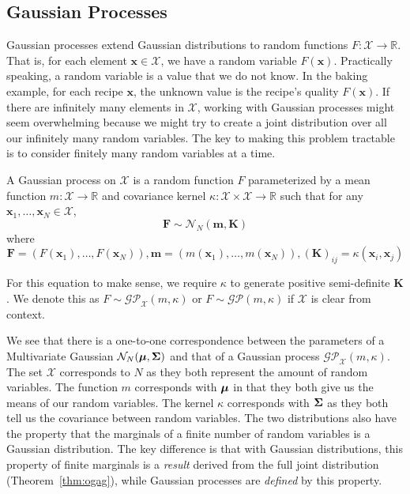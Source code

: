 \subsection{Gaussian Processes}\label{ssec:gp}

Gaussian processes extend Gaussian distributions to random functions $F: \mathcal{X} \to \mathbb{R}$.
That is, for each element $\mathbf{x} \in \mathcal{X}$, we have a random variable $F(\mathbf{x})$.
Practically speaking, a random variable is a value that we do not know.
In the baking example, for each recipe $\mathbf{x}$, the unknown value is the recipe's quality $F(\mathbf{x})$.
If there are infinitely many elements in $\mathcal{X}$, working with Gaussian processes might seem overwhelming because we might try to create a joint distribution over all our infinitely many random variables.
The key to making this problem tractable is to consider finitely many random variables at a time.

\begin{definition}\label{def:gp}
    A Gaussian process on $\mathcal{X}$ is a random function $F$ parameterized by a mean function
    $m: \mathcal{X} \to \mathbb{R}$ and covariance kernel $\kappa: \mathcal{X} \times \mathcal{X} \to \mathbb{R}$
    such that
    for any $\mathbf{x}_1, \dots,\mathbf{x}_N \in \mathcal{X}$,
    \begin{equation*}
        \mathbf{F} \sim \mathcal{N}_N\left(\mathbf{m}, \mathbf{K}\right)
    \end{equation*}
    where
    \begin{equation*}
        \mathbf{F} = (F(\mathbf{x}_1), \dots, F(\mathbf{x}_N)), \mathbf{m} = (m(\mathbf{x}_1), \dots, m(\mathbf{x}_N)), (\mathbf{K})_{ij} = \kappa(\mathbf{x}_i, \mathbf{x}_j)
    \end{equation*}

    For this equation to make sense, we require $\kappa$ to generate positive semi-definite $\mathbf{K}$.
    We denote this as $F \sim \mathcal{GP}_{\mathcal{X}}(m, \kappa)$ or $F \sim \mathcal{GP}(m, \kappa)$ if $\mathcal{X}$ is clear from context.
\end{definition}

We see that there is a one-to-one correspondence between the parameters of a Multivariate Gaussian $\mathcal{N}_{N}(\boldsymbol{\mu}, \boldsymbol{\Sigma})$ and that of a Gaussian process $\mathcal{GP}_{ \mathcal{X}}(m, \kappa)$.
The set $\mathcal{X}$ corresponds to $N$ as they both represent the amount of random variables.
The function $m$ corresponds with $\boldsymbol{\mu}$ in that they both give us the means of our random variables.
The kernel $\kappa$ corresponds with $\boldsymbol{\Sigma}$ as they both tell us the covariance between random variables.
The two distributions also have the property that the marginals of a finite number of random variables is a Gaussian distribution.
The key difference is that with Gaussian distributions, this property of finite marginals is a \emph{result} derived from the full joint distribution (Theorem~\ref{thm:ogag}), while Gaussian processes are \emph{defined} by this property.

